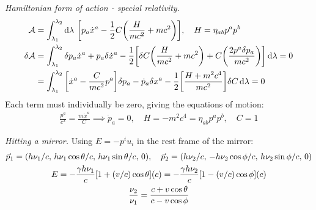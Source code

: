 \documentclass{report}
\begin{document}
\begin{subquests}
	\item \emph{Hamiltonian form of action - special relativity.}
	\begin{align*}
		\mathcal A & = \int_{\lambda_1}^{\lambda_2} \dd{\lambda}\, \bqty{p_a \dot x^a - \frac{1}{2}C\pqty{\frac{H}{mc^2} + mc^2}}, \quad H = \eta_{ab} p^a p^b \\
		\delta\mathcal A & = \int_{\lambda_1}^{\lambda_2}\delta p_a \dot x^a + p_a \delta\dot x^a -\frac{1}{2}\bqty{\delta C\pqty{\frac{H}{mc^2} + mc^2} + C\pqty{\frac{2p^a\delta p_a}{mc^2}}} \dd{\lambda} = 0 \\
		& = \int_{\lambda_1}^{\lambda_2} \bqty{\dot x^a - \frac{C}{mc^2}p^a}\delta p_a - \dot p_a\delta x^a - \frac{1}{2}\bqty{\frac{H + m^2c^4}{mc^2}}\delta C \dd{\lambda} = 0
	\end{align*}
	Each term must individually be zero, giving the equations of motion:
	\begin{gather*}
		\frac{p^a}{c^2} = \frac{m\dot x^a}{C} \implies \dot p_a = 0, \quad H = -m^2c^4 = \eta_{ab}p^a p^b, \quad C=1 
	\end{gather*}

	\item \emph{Hitting a mirror.}
	Using $E = -p^i u_i$ in the rest frame of the mirror:
	\begin{gather*}
		\vec p_1 = \pqty{h\nu_1/c,\, h\nu_1\cos\theta/c,\, h\nu_1\sin\theta/c,\,0}, \quad \vec p_2 = \pqty{h\nu_2/c,\, -h\nu_2\cos\phi/c,\, h\nu_2\sin\phi/c,\,0} \\
		E = -\frac{\gamma h \nu_1}{c}\bqty{1 + (v/c)\cos\theta}\pqty{c} = -\frac{\gamma h \nu_2}{c}\bqty{1 - (v/c)\cos\phi}\pqty{c} \\
		\frac{\nu_2}{\nu_1} = \frac{c + v\cos\theta}{c - v\cos\phi}
	\end{gather*}


\end{subquests}
\end{document}
